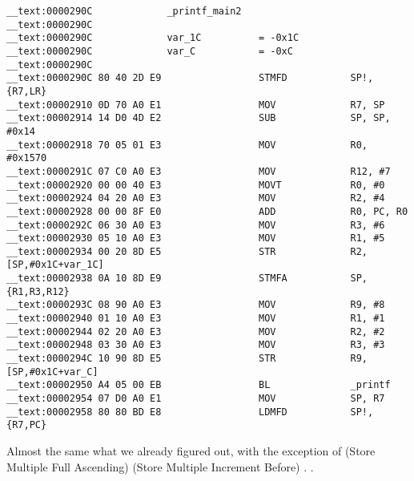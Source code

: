 \begin{lstlisting}
__text:0000290C             _printf_main2
__text:0000290C
__text:0000290C             var_1C          = -0x1C
__text:0000290C             var_C           = -0xC
__text:0000290C
__text:0000290C 80 40 2D E9                 STMFD           SP!, {R7,LR}
__text:00002910 0D 70 A0 E1                 MOV             R7, SP
__text:00002914 14 D0 4D E2                 SUB             SP, SP, #0x14
__text:00002918 70 05 01 E3                 MOV             R0, #0x1570
__text:0000291C 07 C0 A0 E3                 MOV             R12, #7
__text:00002920 00 00 40 E3                 MOVT            R0, #0
__text:00002924 04 20 A0 E3                 MOV             R2, #4
__text:00002928 00 00 8F E0                 ADD             R0, PC, R0
__text:0000292C 06 30 A0 E3                 MOV             R3, #6
__text:00002930 05 10 A0 E3                 MOV             R1, #5
__text:00002934 00 20 8D E5                 STR             R2, [SP,#0x1C+var_1C]
__text:00002938 0A 10 8D E9                 STMFA           SP, {R1,R3,R12}
__text:0000293C 08 90 A0 E3                 MOV             R9, #8
__text:00002940 01 10 A0 E3                 MOV             R1, #1
__text:00002944 02 20 A0 E3                 MOV             R2, #2
__text:00002948 03 30 A0 E3                 MOV             R3, #3
__text:0000294C 10 90 8D E5                 STR             R9, [SP,#0x1C+var_C]
__text:00002950 A4 05 00 EB                 BL              _printf
__text:00002954 07 D0 A0 E1                 MOV             SP, R7
__text:00002958 80 80 BD E8                 LDMFD           SP!, {R7,PC}
\end{lstlisting}

{Almost the same what we already figured out, with the
exception of}  (Store Multiple Full Ascending) 
 (Store Multiple Increment Before) . 
.

